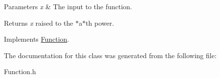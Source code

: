\begin{DoxyParams}{Parameters}
{\em x} & The input to the function. \\
\hline
\end{DoxyParams}
\begin{DoxyReturn}{Returns}
{\itshape x} raised to the $\ast$a$\ast$th power. 
\end{DoxyReturn}


Implements \hyperlink{class_function_a7773feae8f1def0a2d7e479363700816}{Function}.



The documentation for this class was generated from the following file\+:\begin{DoxyCompactItemize}
\item 
Function.\+h\end{DoxyCompactItemize}
